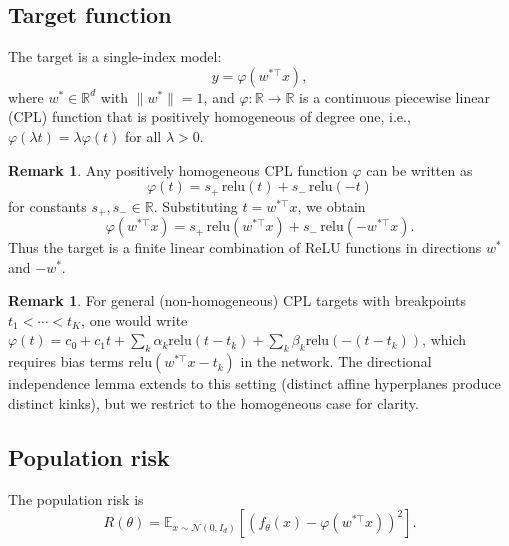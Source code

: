 \documentclass[11pt]{amsart}
\theoremstyle{definition}
\newtheorem{remark}[theorem]{Remark}
\newcommand{\R}{\mathbb{R}}
\newcommand{\E}{\mathbb{E}}
\newcommand{\norm}[1]{\| #1 \|}
\newcommand{\relu}{\mathrm{relu}}
\begin{document}
\subsection{Target function}

The target is a single-index model:
\begin{equation}\label{eq:target}
y = \varphi(w^{*\top} x),
\end{equation}
where $w^* \in \R^d$ with $\norm{w^*} = 1$, and $\varphi : \R \to \R$ is a continuous piecewise linear (CPL) function that is positively homogeneous of degree one, i.e., $\varphi(\lambda t) = \lambda \varphi(t)$ for all $\lambda > 0$.

\begin{remark}\label{rem:cpl-relu}
Any positively homogeneous CPL function $\varphi$ can be written as
\begin{equation}\label{eq:cpl-decomp}
\varphi(t) = s_+ \, \relu(t) + s_- \, \relu(-t)
\end{equation}
for constants $s_+, s_- \in \R$. Substituting $t = w^{*\top} x$, we obtain
\begin{equation}\label{eq:target-relu}
\varphi(w^{*\top} x) = s_+ \, \relu(w^{*\top} x) + s_- \, \relu(-w^{*\top} x).
\end{equation}
Thus the target is a finite linear combination of ReLU functions in directions $w^*$ and $-w^*$.
\end{remark}

\begin{remark}\label{rem:general-cpl}
For general (non-homogeneous) CPL targets with breakpoints $t_1 < \cdots < t_K$, one would write $\varphi(t) = c_0 + c_1 t + \sum_k \alpha_k \relu(t - t_k) + \sum_k \beta_k \relu(-(t-t_k))$, which requires bias terms $\relu(w^{*\top}x - t_k)$ in the network. The directional independence lemma extends to this setting (distinct affine hyperplanes produce distinct kinks), but we restrict to the homogeneous case for clarity.
\end{remark}

\subsection{Population risk}

The population risk is
\begin{equation}\label{eq:risk}
R(\theta) = \E_{x \sim \mathcal{N}(0, I_d)} \left[ \left( f_\theta(x) - \varphi(w^{*\top} x) \right)^2 \right].
\end{equation}
\end{document}
